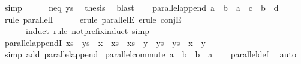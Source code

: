 \begin{isabellebody}
\ simp\isanewline
\ \ \ \ \isamarkupfalse%
\ neq\ ys\ \isamarkupfalse%
\ {\isacharquery}thesis\ \isamarkupfalse%
\ blast\isanewline
\ \ \isamarkupfalse%
\isanewline
{}\isamarkupfalse%
%
\endisatagproof
{\isafoldproof}%
%
\isadelimproof
\isanewline
%
\endisadelimproof
\isanewline
{}\isamarkupfalse%
\ parallel{\isacharunderscore}append{\isacharcolon}\ {\isachardoublequoteopen}a\ {\isasymparallel}\ b\ {\isasymLongrightarrow}\ a\ {\isacharat}\ c\ {\isasymparallel}\ b\ {\isacharat}\ d{\isachardoublequoteclose}\isanewline
%
\isadelimproof
\ \ %
\endisadelimproof
%
\isatagproof
{}\isamarkupfalse%
\ {\isacharparenleft}rule\ parallelI{\isacharparenright}\isanewline
\ \ \ \ \isamarkupfalse%
\ {\isacharparenleft}erule\ parallelE{\isacharcomma}\ erule\ conjE{\isacharcomma}\isanewline
\ \ \ \ \ \ induct\ rule{\isacharcolon}\ not{\isacharunderscore}prefix{\isacharunderscore}induct{\isacharcomma}\ simp{\isacharplus}{\isacharparenright}{\isacharplus}\isanewline
\ \ \isamarkupfalse%
%
\endisatagproof
{\isafoldproof}%
%
\isadelimproof
\isanewline
%
\endisadelimproof
\isanewline
{}\isamarkupfalse%
\ parallel{\isacharunderscore}appendI{\isacharcolon}\ {\isachardoublequoteopen}xs\ {\isasymparallel}\ ys\ {\isasymLongrightarrow}\ x\ {\isacharequal}\ xs\ {\isacharat}\ xs{\isacharprime}\ {\isasymLongrightarrow}\ y\ {\isacharequal}\ ys\ {\isacharat}\ ys{\isacharprime}\ {\isasymLongrightarrow}\ x\ {\isasymparallel}\ y{\isachardoublequoteclose}\isanewline
%
\isadelimproof
\ \ %
\endisadelimproof
%
\isatagproof
{}\isamarkupfalse%
\ {\isacharparenleft}simp\ add{\isacharcolon}\ parallel{\isacharunderscore}append{\isacharparenright}%
\endisatagproof
{\isafoldproof}%
%
\isadelimproof
\isanewline
%
\endisadelimproof
\isanewline
{}\isamarkupfalse%
\ parallel{\isacharunderscore}commute{\isacharcolon}\ {\isachardoublequoteopen}a\ {\isasymparallel}\ b\ {\isasymlongleftrightarrow}\ b\ {\isasymparallel}\ a{\isachardoublequoteclose}\isanewline
%
\isadelimproof
\ \ %
\endisadelimproof
%
\isatagproof
{}\isamarkupfalse%
\ parallel{\isacharunderscore}def\ \isamarkupfalse%
\ auto%
\endisatagproof
{\isafoldproof}%
%
\isadelimproof
%
\endisadelimproof
%
\isadelimdocument
%
\endisadelimdocument
%
\isatagdocument
%
\isamarkuptrue%
%
\endisatagdocument
{\isafolddocument}%
%
\isadelimdocument
%
\endisadelimdocument
{}\isamarkupfalse%

\end{isabellebody}
